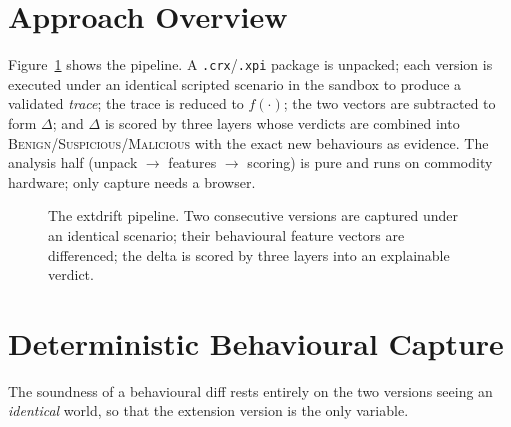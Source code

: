 \documentclass[conference]{IEEEtran}
\begin{document}
\section{Approach Overview}
Figure~\ref{fig:pipeline} shows the pipeline. A \texttt{.crx}/\texttt{.xpi} package is unpacked;
each version is executed under an identical scripted scenario in the sandbox to produce a
validated \emph{trace}; the trace is reduced to $f(\cdot)$; the two vectors are subtracted to form
$\Delta$; and $\Delta$ is scored by three layers whose verdicts are combined into
\textsc{Benign}/\textsc{Suspicious}/\textsc{Malicious} with the exact new behaviours as evidence.
The analysis half (unpack $\rightarrow$ features $\rightarrow$ scoring) is pure and runs on
commodity hardware; only capture needs a browser.

\begin{figure}[t]
\centering
{}
\caption{The extdrift pipeline. Two consecutive versions are captured under an identical
scenario; their behavioural feature vectors are differenced; the delta is scored by three
layers into an explainable verdict.}
\label{fig:pipeline}
\end{figure}

\section{Deterministic Behavioural Capture}
The soundness of a behavioural diff rests entirely on the two versions seeing an
\emph{identical} world, so that the extension version is the only variable.
\end{document}
